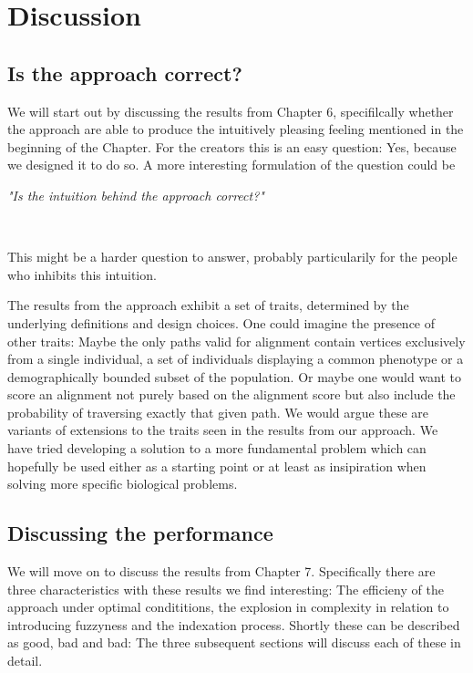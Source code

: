 \documentclass[thesis.tex]{subfiles}
\begin{document}
\chapter{Discussion}
\section{Is the approach correct?}
We will start out by discussing the results from Chapter 6, specifilcally whether the approach are able to produce the intuitively pleasing feeling mentioned in the beginning of the Chapter. For the creators this is an easy question: Yes, because we designed it to do so. A more interesting formulation of the question could be\\
\par\noindent
\centerline{\textit{"Is the intuition behind the approach correct?"}}\\
\par\noindent
This might be a harder question to answer, probably particularily for the people who inhibits this intuition. \\
\par\noindent
The results from the approach exhibit a set of traits, determined by the underlying definitions and design choices. One could imagine the presence of other traits: Maybe the only paths valid for alignment contain vertices exclusively from a single individual, a set of individuals displaying a common phenotype or a demographically bounded subset of the population. Or maybe one would want to score an alignment not purely based on the alignment score but also include the probability of traversing exactly that given path. We would argue these are variants of extensions to the traits seen in the results from our approach. We have tried developing a solution to a more fundamental problem which can hopefully be used either as a starting point or at least as insipiration when solving more specific biological problems. 
\section{Discussing the performance}
We will move on to discuss the results from Chapter 7. Specifically there are three characteristics with these results we find interesting: The efficieny of the approach under optimal condititions, the explosion in complexity in relation to introducing fuzzyness and the indexation process. Shortly these can be described as good, bad and bad: The three subsequent sections will discuss each of these in detail.
\end{document}

